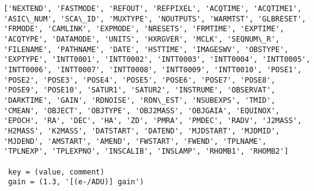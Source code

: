 \documentclass[11pt]{article}
\begin{document}
    \begin{Verbatim}[commandchars=\\\{\}]
['NEXTEND', 'FASTMODE', 'REFOUT', 'REFPIXEL', 'ACQTIME', 'ACQTIME1', 'ASIC\_NUM', 'SCA\_ID', 'MUXTYPE', 'NOUTPUTS', 'WARMTST', 'GLBRESET', 'FRMODE', 'CAMLINK', 'EXPMODE', 'NRESETS', 'FRMTIME', 'EXPTIME', 'ACQTYPE', 'DATAMODE', 'UNITS', 'HXRGVER', 'MCLK', 'SEQNUM\_R', 'FILENAME', 'PATHNAME', 'DATE', 'HSTTIME', 'IMAGESWV', 'OBSTYPE', 'EXPTYPE', 'INTT0001', 'INTT0002', 'INTT0003', 'INTT0004', 'INTT0005', 'INTT0006', 'INTT0007', 'INTT0008', 'INTT0009', 'INTT0010', 'POSE1', 'POSE2', 'POSE3', 'POSE4', 'POSE5', 'POSE6', 'POSE7', 'POSE8', 'POSE9', 'POSE10', 'SATUR1', 'SATUR2', 'INSTRUME', 'OBSERVAT', 'DARKTIME', 'GAIN', 'RDNOISE', 'RON\_EST', 'NSUBEXPS', 'TMID', 'CMEAN', 'OBJECT', 'OBJTYPE', 'OBJ2MASS', 'OBJGAIA', 'EQUINOX', 'EPOCH', 'RA', 'DEC', 'HA', 'ZD', 'PMRA', 'PMDEC', 'RADV', 'J2MASS', 'H2MASS', 'K2MASS', 'DATSTART', 'DATEND', 'MJDSTART', 'MJDMID', 'MJDEND', 'AMSTART', 'AMEND', 'FWSTART', 'FWEND', 'TPLNAME', 'TPLNEXP', 'TPLEXPNO', 'INSCALIB', 'INSLAMP', 'RHOMB1', 'RHOMB2']

 key = (value, comment)
 gain = (1.3, '[(e-/ADU)] gain')

    \end{Verbatim}
\end{document}
